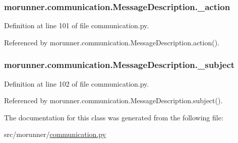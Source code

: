 \subsubsection[{\+\_\+action}]{\setlength{\rightskip}{0pt plus 5cm}morunner.\+communication.\+Message\+Description.\+\_\+action\hspace{0.3cm}{\ttfamily [private]}}\label{classmorunner_1_1communication_1_1MessageDescription_a812e6e0ac14765422a3b5c17443501d5}


Definition at line 101 of file communication.\+py.



Referenced by morunner.\+communication.\+Message\+Description.\+action().

\hypertarget{classmorunner_1_1communication_1_1MessageDescription_abdd477c4b0afa84b46bd40b9f2f583c1}{}
\subsubsection[{\+\_\+subject}]{\setlength{\rightskip}{0pt plus 5cm}morunner.\+communication.\+Message\+Description.\+\_\+subject\hspace{0.3cm}{\ttfamily [private]}}\label{classmorunner_1_1communication_1_1MessageDescription_abdd477c4b0afa84b46bd40b9f2f583c1}


Definition at line 102 of file communication.\+py.



Referenced by morunner.\+communication.\+Message\+Description.\+subject().



The documentation for this class was generated from the following file\+:\begin{DoxyCompactItemize}
\item 
src/morunner/\hyperlink{communication_8py}{communication.\+py}\end{DoxyCompactItemize}
